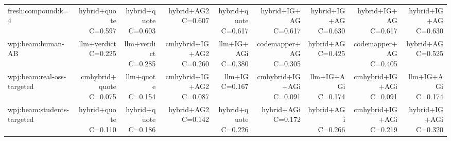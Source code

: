 \begin{table}[t]
{\begin{tabular}{@{}lrrrrrrrr@{}}
fresh:compound:k=4 & \shortstack{hybrid+quote\\C=0.597} & \shortstack{hybrid+quote\\C=0.603} & \shortstack{hybrid+AG2\\C=0.607} & \shortstack{hybrid+quote\\C=0.617} & \shortstack{hybrid+IG+AG\\C=0.617} & \shortstack{hybrid+IG+AG\\C=0.630} & \shortstack{hybrid+IG+AG\\C=0.617} & \shortstack{hybrid+IG+AG\\C=0.630} \\
wpj:beam:human-AB & \shortstack{llm+verdict\\C=0.225} & \shortstack{llm+verdict\\C=0.285} & \shortstack{cmhybrid+IG+AG2\\C=0.260} & \shortstack{llm+IG+AGi\\C=0.380} & \shortstack{codemapper+AG\\C=0.305} & \shortstack{hybrid+AG\\C=0.425} & \shortstack{codemapper+AG\\C=0.405} & \shortstack{hybrid+AG\\C=0.525} \\
wpj:beam:real-oss-targeted & \shortstack{cmhybrid+quote\\C=0.075} & \shortstack{llm+quote\\C=0.154} & \shortstack{cmhybrid+IG+AG2\\C=0.087} & \shortstack{llm+IG\\C=0.167} & \shortstack{cmhybrid+IG+AGi\\C=0.091} & \shortstack{llm+IG+AGi\\C=0.174} & \shortstack{cmhybrid+IG+AGi\\C=0.091} & \shortstack{llm+IG+AGi\\C=0.174} \\
wpj:beam:students-targeted & \shortstack{hybrid+quote\\C=0.110} & \shortstack{hybrid+quote\\C=0.186} & \shortstack{hybrid+AG2\\C=0.142} & \shortstack{hybrid+quote\\C=0.226} & \shortstack{hybrid+AGi\\C=0.172} & \shortstack{hybrid+AGi\\C=0.266} & \shortstack{cmhybrid+IG+AGi\\C=0.219} & \shortstack{hybrid+IG+AGi\\C=0.320} \\

\end{tabular}}
\end{table}
